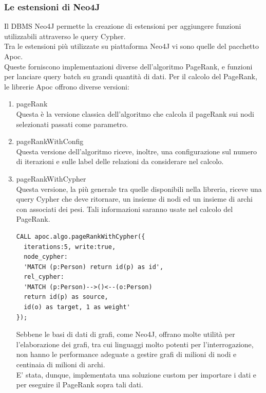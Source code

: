 \documentclass[a4paper, 12pt]{article}
\begin{document}
\subsubsection{Le estensioni di Neo4J}
Il DBMS Neo4J permette la creazione di estensioni per aggiungere funzioni utilizzabili attraverso le query Cypher. \\
Tra le estensioni più utilizzate su piattaforma Neo4J vi sono quelle del pacchetto Apoc. \\
Queste forniscono implementazioni diverse dell'algoritmo PageRank, e funzioni per lanciare query batch su grandi quantità di dati.
Per il calcolo del PageRank, le librerie Apoc offrono diverse versioni:
\begin{enumerate}
  \item pageRank \\
  Questa è la versione classica dell'algoritmo che calcola il pageRank sui nodi selezionati passati come parametro.
  \item pageRankWithConfig \\
  Questa versione dell'algoritmo riceve, inoltre, una configurazione sul numero di iterazioni e sulle label delle relazioni da considerare nel calcolo.
  \item pageRankWithCypher \\
  Questa versione, la più generale tra quelle disponibili nella libreria, riceve una query Cypher che deve ritornare, un insieme di nodi ed un insieme di archi con associati dei pesi. Tali informazioni saranno usate nel calcolo del PageRank.
  \begin{lstlisting}
CALL apoc.algo.pageRankWithCypher({
  iterations:5, write:true, 
  node_cypher:
  'MATCH (p:Person) return id(p) as id',
  rel_cypher: 
  'MATCH (p:Person)-->()<--(o:Person)
  return id(p) as source,
  id(o) as target, 1 as weight'
});
\end{lstlisting} 

\par
Sebbene le basi di dati di grafi, come Neo4J, offrano molte utilità per l'elaborazione dei grafi, tra cui linguaggi molto potenti per l'interrogazione, non hanno le performance adeguate a gestire grafi di milioni di nodi e centinaia di milioni di archi. \\
E' stata, dunque, implementata una soluzione custom per importare i dati e per eseguire il PageRank sopra tali dati.
\end{enumerate}
\end{document}
